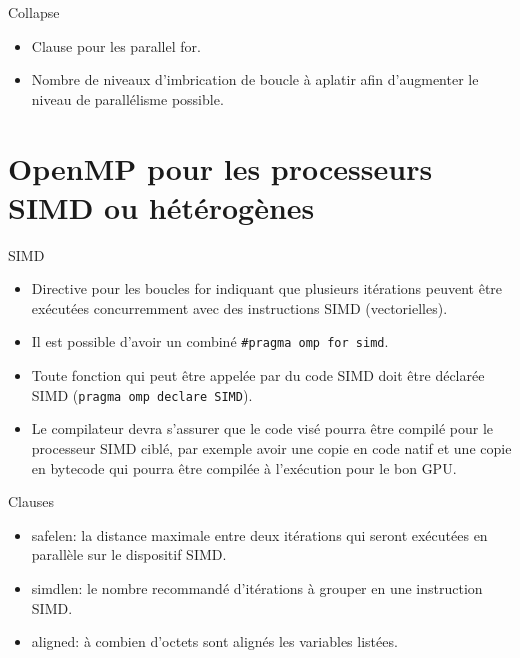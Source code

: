 \documentclass[10pt]{beamer}
\begin{document}
\begin{frame}{Collapse}

  \begin{itemize}
    \item Clause pour les parallel for.

    \item Nombre de niveaux d'imbrication de boucle à aplatir afin d'augmenter le niveau de parallélisme possible.
  \end{itemize}
\end{frame}

\section{OpenMP pour les processeurs SIMD ou hétérogènes}

\begin{frame}[fragile]{SIMD}

  \begin{itemize}
    \item Directive pour les boucles for indiquant que plusieurs itérations peuvent être exécutées concurremment avec des instructions SIMD (vectorielles).

    \item Il est possible d'avoir un combiné \verb|#pragma omp for simd|.

    \item Toute fonction qui peut être appelée par du code SIMD doit être déclarée SIMD (\texttt{pragma omp declare SIMD}).

    \item Le compilateur devra s'assurer que le code visé pourra être compilé pour le processeur SIMD ciblé, par exemple avoir une copie en code natif et une copie en bytecode qui pourra être compilée à l'exécution pour le bon GPU.
  \end{itemize}
\end{frame}

\begin{frame}{Clauses}

  \begin{itemize}
    \item safelen: la distance maximale entre deux itérations qui seront exécutées en parallèle sur le dispositif SIMD.
    
    \item simdlen: le nombre recommandé d'itérations à grouper en une instruction SIMD.
    
    \item aligned: à combien d'octets sont alignés les variables listées.
%
  \end{itemize}
\end{frame}
\end{document}

